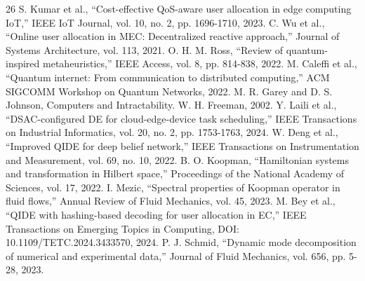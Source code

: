 \documentclass[12pt,a4paper]{article}
\begin{document}
\begin{thebibliography}{26}
 S. Kumar et al., ``Cost-effective QoS-aware user allocation in edge computing IoT,'' IEEE IoT Journal, vol. 10, no. 2, pp. 1696-1710, 2023.
 C. Wu et al., ``Online user allocation in MEC: Decentralized reactive approach,'' Journal of Systems Architecture, vol. 113, 2021.
 O. H. M. Ross, ``Review of quantum-inspired metaheuristics,'' IEEE Access, vol. 8, pp. 814-838, 2022.
 M. Caleffi et al., ``Quantum internet: From communication to distributed computing,'' ACM SIGCOMM Workshop on Quantum Networks, 2022.
 M. R. Garey and D. S. Johnson, Computers and Intractability. W. H. Freeman, 2002.
 Y. Laili et al., ``DSAC-configured DE for cloud-edge-device task scheduling,'' IEEE Transactions on Industrial Informatics, vol. 20, no. 2, pp. 1753-1763, 2024.
 W. Deng et al., ``Improved QIDE for deep belief network,'' IEEE Transactions on Instrumentation and Measurement, vol. 69, no. 10, 2022.
 B. O. Koopman, ``Hamiltonian systems and transformation in Hilbert space,'' Proceedings of the National Academy of Sciences, vol. 17, 2022.
 I. Mezic, ``Spectral properties of Koopman operator in fluid flows,'' Annual Review of Fluid Mechanics, vol. 45, 2023.
 M. Bey et al., ``QIDE with hashing-based decoding for user allocation in EC,'' IEEE Transactions on Emerging Topics in Computing, DOI: 10.1109/TETC.2024.3433570, 2024.
 P. J. Schmid, ``Dynamic mode decomposition of numerical and experimental data,'' Journal of Fluid Mechanics, vol. 656, pp. 5-28, 2023.
\end{thebibliography}
\end{document}
